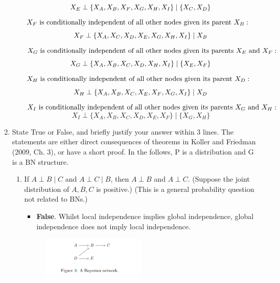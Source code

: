 \documentclass[a3paper,12pt]{extarticle} %
\begin{document}
\begin{enumerate}
\begin{enumerate}
    \)
    \[
        X_E \perp \{X_A, X_B, X_F, X_G, X_H, X_I\} \mid \{X_C, X_D\} \\
    \]
    \(
        X_F \text{ is conditionally independent of all other nodes given its parent } X_B: \\
    \)
    \[
        X_F \perp \{X_A, X_C, X_D, X_E, X_G, X_H, X_I\} \mid X_B \\
    \]
    \(
        X_G \text{ is conditionally independent of all other nodes given its parents } X_E \text{ and } X_F: \\
    \)
    \[
        X_G \perp \{X_A, X_B, X_C, X_D, X_H, X_I\} \mid \{X_E, X_F\} \\
    \]
    \(
        X_H \text{ is conditionally independent of all other nodes given its parent } X_D: \\
    \)
    \[
        X_H \perp \{X_A, X_B, X_C, X_E, X_F, X_G, X_I\} \mid X_D \\
    \]
    \(
        X_I \text{ is conditionally independent of all other nodes given its parents } X_G \text{ and } X_H: \\
    \)
    \[
        X_I \perp \{X_A, X_B, X_C, X_D, X_E, X_F\} \mid \{X_G, X_H\}
    \]
\end{enumerate}
\item  State True or False, and briefly justify your answer within 3 lines. The statements are either
direct consequences of theorems in Koller and Friedman (2009, Ch. 3), or have a short proof. In the
follows, P is a distribution and G is a BN structure.
\begin{enumerate}
    \item If \( A \perp B \mid C \) and \( A \perp C \mid B \), then \( A \perp B \) and \( A \perp C \). (Suppose the joint distribution of \( A, B, C \) is positive.) (This is a general probability question not related to BNs.)
    \begin{itemize}
        \item \textbf{False}. Whilst local independence implies global independence, global independence does not imply local independence.
    \end{itemize}
    \begin{figure}[h]
        \centering
        \includegraphics[width=0.5\textwidth]{bn2.png}

\end{figure}
\end{enumerate}
\end{enumerate}
\end{document}
